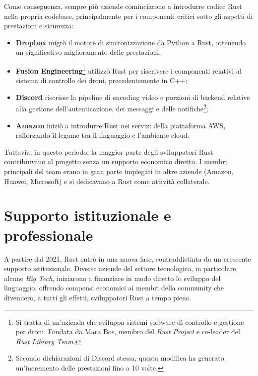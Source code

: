 Come conseguenza, sempre più aziende cominciarono a introdurre codice Rust nella propria codebase, principalmente per i componenti critici sotto 
gli aspetti di prestazioni e sicurezza:
\begin{itemize}
    \item \textbf{Dropbox} migrò il motore di sincronizzazione da Python a Rust, ottenendo un significativo miglioramento delle prestazioni;
    \item \textbf{Fusion Engineering}\footnote{Si tratta di un'azienda che sviluppa sistemi software di controllo e gestione per droni. Fondata da Mara Bos, membro del \textit{Rust Project} e co-leader del \textit{Rust Library Team}.} utilizzò Rust per riscrivere i componenti relativi al sistema di controllo dei droni, precedentemente in C++;
    \item \textbf{Discord} riscrisse la pipeline di encoding video e porzioni di backend relative alla gestione dell'autenticazione, dei messaggi e delle notifiche\footnote{Secondo dichiarazioni di Discord stessa, questa modifica ha generato un'incremento delle prestazioni fino a 10 volte.};
    \item \textbf{Amazon} iniziò a introdurre Rust nei servizi della piattaforma AWS, rafforzando il legame tra il linguaggio e l'ambiente cloud.
\end{itemize}
Tuttavia, in questo periodo, la maggior parte degli sviluppatori Rust contribuivano al progetto senza un supporto economico diretto.
I membri principali del team erano in gran parte impiegati in altre aziende (Amazon, Huawei, Microsoft) e si dedicavano a Rust come attività collaterale.

\section{Supporto istituzionale e professionale}
A partire dal 2021, Rust entrò in una nuova fase, contraddistinta da un crescente supporto istituzionale. Diverse aziende del settore 
tecnologico, in particolare alcune \textit{Big Tech}, iniziarono a finanziare in modo diretto lo sviluppo del linguaggio, offrendo compensi 
economici ai membri della community che divennero, a tutti gli effetti, sviluppatori Rust a tempo pieno.

